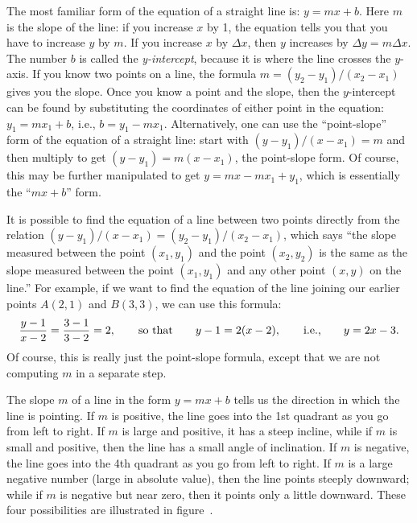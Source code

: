 The most familiar form of the equation of a straight line is:
$y=mx+b$.  Here $m$ is the slope of the line: if you increase $x$ by
1, the equation tells you that you have to increase $y$ by $m$.  If
you increase $x$ by $\Delta x$, then $y$ increases by $\Delta
y=m\Delta x$.  The number $b$ is called the {\it y-intercept}, because
it is where the line crosses the $y$-axis.  If you know two points on
a line, the formula $m=(y_2-y_1)/ (x_2-x_1)$ gives you the slope.
Once you know a point and the slope, then the $y$-intercept can be
found by substituting the coordinates of either point in the equation:
$y_1=mx_1+b$, i.e., $b=y_1-mx_1$.  Alternatively, one can use the
``point-slope'' form of the equation of a straight line: start with
$(y-y_1)/(x-x_1)=m$ and then multiply to get $(y-y_1)=m(x-x_1)$, the
point-slope form. Of course, this may be further manipulated to get
$y=mx-mx_1+y_1$, which is essentially the ``$mx+b$'' form.

It is possible to find the equation of a line between two points directly
from the relation $(y-y_1)/(x-x_1)=(y_2-y_1)/(x_2-x_1)$, which says ``the
slope measured between the point $(x_1,y_1)$ and the point $(x_2,y_2)$ is
the same as the slope measured between the point $(x_1,y_1)$ and any other
point $(x,y)$ on the line.''  For example, if we want to find the equation
of the line joining our earlier points $A(2,1)$ and $B(3,3)$, we can use
this formula:
$$
{y-1\over x-2}={3-1\over 3-2}=2,\qquad\hbox{so~that}\qquad
y-1=2(x-2),\qquad\hbox{i.e.,}\qquad y=2x-3.
$$
Of course, this is really just the point-slope formula, except that we
are not computing $m$ in a separate step.

The slope $m$ of a line in the form $y=mx+b$ tells us the
direction in which the line is pointing.  If $m$ is positive, the line goes
into the 1st quadrant as you go from left to right.   If $m$ is large and
positive, it has a steep incline, while if $m$ is small and positive, 
then the line has a small angle of inclination.  If $m$ is negative, the
line goes into the 4th quadrant as you go from left to right.  If $m$ is
a large negative number (large in absolute value), then the line points
steeply downward; while if $m$ is negative but near zero, then it points
only a little downward.  These four possibilities are illustrated in 
figure~.

